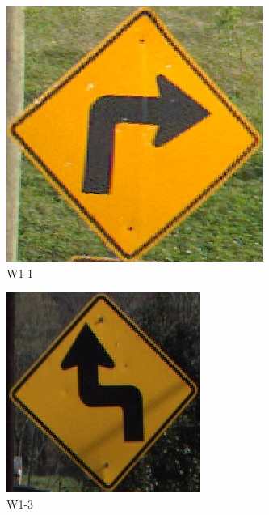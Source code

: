 \begin{figure}
  \begin{center}
    \begin{subfigure}[t]{.3\linewidth}
      \centering
      \includegraphics[height=0.8\linewidth]{figures/W1-1_R.jpg}
      \caption{W1-1}
    \end{subfigure}
    \begin{subfigure}[t]{.3\linewidth}
      \centering
      \includegraphics[height=0.8\linewidth]{figures/W1-3_L.jpg}
      \caption{W1-3}
    \end{subfigure}
    \begin{subfigure}[t]{.3\linewidth}

\end{subfigure}
\end{center}
\end{figure}
